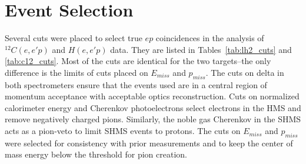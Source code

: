 \section{Event Selection}
Several cuts were placed to select true $ep$ coincidences in the
analysis of ${}^{12}C(e,e'p)$ and $H(e,e'p)$ data.
They are listed in Tables~\ref{tab:lh2_cuts} and \ref{tab:c12_cuts}.
Most of the cuts are identical for the two targets--the only difference is the
limits of cuts placed on $E_{miss}$ and $p_{miss}$.
The cuts on delta in both spectrometers ensure that the events used are in a
central region of momentum acceptance with acceptable optics reconstruction.
Cuts on normalized calorimeter energy and Cherenkov photoelectrons select
electrons in the HMS and remove negatively charged pions.
Similarly, the noble gas Cherenkov in the SHMS acts as a pion-veto to limit
SHMS events to protons.
The cuts on $E_{miss}$ and $p_{miss}$ were selected
for consistency with prior measurements and
to keep the center of mass energy below the threshold for pion creation.

\begin{table}[h]
    \centering
    \caption{List of cuts used to select clean $H(e,e'p)$ events.}
    \label{tab:lh2_cuts}
\end{table}

